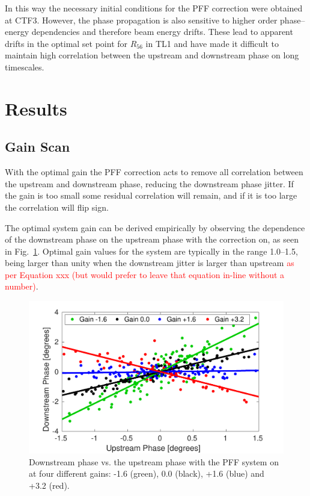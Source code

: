 \documentclass[%
 reprint,
 amsmath,amssymb,
 prl,
]{revtex4-1}
\begin{document}
In this way the necessary initial conditions for the PFF correction were 
obtained at CTF3. However, the phase propagation is also sensitive to higher 
order phase--energy dependencies and therefore beam energy drifts. These lead 
to apparent drifts in the optimal set point for \(R_{56}\) in TL1 and have made 
it difficult to maintain high correlation between the upstream and downstream 
phase on long timescales.

\section{\label{s:results}Results}

\subsection{\label{ss:gScan}Gain Scan}

With the optimal gain the PFF correction acts to remove all correlation between 
the upstream and downstream phase, reducing the downstream phase jitter. If the 
gain is too small some residual correlation will remain, and if it is too large 
the correlation will flip sign. 

The optimal system gain can be derived empirically by observing the dependence 
of the downstream phase on the upstream phase with the correction on, as seen 
in Fig.~\ref{fig:gScan}. Optimal gain values for the system are typically in 
the range 1.0--1.5, being larger than unity when the downstream jitter is 
larger than upstream \textcolor{red}{as per Equation xxx (but would prefer to 
leave that equation in-line without a number)}. 

\begin{figure}
\includegraphics[width=\columnwidth]{figs/gScan}%
\caption{\label{fig:gScan}Downstream phase vs. the upstream phase with the PFF 
system on at four different gains: -1.6 (green), 0.0 (black), +1.6 (blue) and 
+3.2 (red).}
\end{figure}
\end{document}
